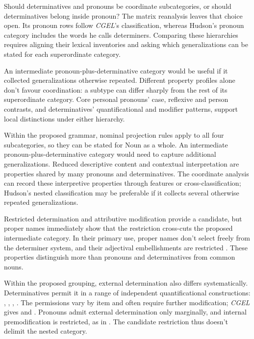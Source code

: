 \documentclass[12pt]{article}
\begin{document}
Should determinatives and pronouns be coordinate subcategories, or should determinatives belong inside pronoun? The matrix reanalysis leaves that choice open. Its pronoun rows follow \textit{CGEL}'s classification, whereas Hudson's pronoun category includes the words he calls determiners. Comparing these hierarchies requires aligning their lexical inventories and asking which generalizations can be stated for each superordinate category.

An intermediate pronoun-plus-determinative category would be useful if it collected generalizations otherwise repeated. Different property profiles alone don't favour coordination: a subtype can differ sharply from the rest of its superordinate category. Core personal pronouns' case, reflexive and person contrasts, and determinatives' quantificational and modifier patterns, support local distinctions under either hierarchy.

Within the proposed grammar, nominal projection rules apply to all four subcategories, so they can be stated for Noun as a whole. An intermediate pronoun-plus-determinative category would need to capture additional generalizations. Reduced descriptive content and contextual interpretation are properties shared by many pronouns and determinatives. The coordinate analysis can record these interpretive properties through features or cross-classification; Hudson's nested classification may be preferable if it collects several otherwise repeated generalizations.

Restricted determination and attributive modification provide a candidate, but proper names immediately show that the restriction cross-cuts the proposed intermediate category. In their primary use, proper names don't select freely from the determiner system, and their adjectival embellishments are restricted \citep[517, 519--520]{huddleston2002}. These properties distinguish more than pronouns and determinatives from common nouns.

Within the proposed grouping, external determination also differs systematically. Determinatives permit it in a range of independent quantificational constructions: , , , . The permissions vary by item and often require further modification; \textit{CGEL} gives  and  \citep[415--416]{huddleston2002}. Pronouns admit external determination only marginally, and internal premodification is restricted, as in  \citep[429--430]{huddleston2002}. The candidate restriction thus doesn't delimit the nested category.
\end{document}
